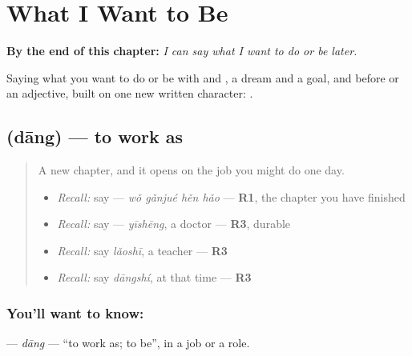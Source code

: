 
\chapter{What I Want to Be}
\label{ch:zh-what-i-want-to-be}

\begin{chapteropening}
\textbf{By the end of this chapter:} \emph{I can say what I want to do or be later.}

Saying what you want to do or be with  and , a dream and a goal, and  before  or an adjective, built on one new written character: .
\end{chapteropening}

\section[\texorpdfstring{\zh{当} (dāng)}{当 (dāng)}]{ (dāng) — to work as}

\label{lesson:ZH-C287-dang}



\begin{quote}
A new chapter, and it opens on the job you might do one day.

\begin{itemize}
\raggedright
  \item \emph{Recall:} say  — \emph{wǒ gǎnjué hěn hǎo} — \textbf{R1}, the chapter you have finished
  \item \emph{Recall:} say  — \emph{yīshēng}, a doctor — \textbf{R3}, durable
  \item \emph{Recall:} say \emph{lǎoshī}, a teacher — \textbf{R3}
  \item \emph{Recall:} say \emph{dāngshí}, at that time — \textbf{R3}
\end{itemize}
\end{quote}

\subsection*{You'll want to know: }
\textbf{} — \emph{dāng} — \textquotedblleft{}to work as; to be\textquotedblright{}, in a job or a role.

